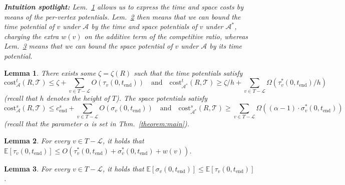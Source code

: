 \documentclass[11pt]{article}
\newtheorem{lemma}[theorem]{Lemma}
\theoremstyle{definition}
\theoremstyle{plain}
\newtheorem{lemma}[theorem]{Lemma}
\theoremstyle{definition}
\theoremstyle{plain}
\newtheorem{lemma}{Lemma}[section]
\theoremstyle{definition}
\theoremstyle{plain}
\newenvironment{IntuitionSpotlight}[0]
{\par%
\setlength{\leftskip}{0.5\parindent}%
\setlength{\rightskip}{0.5\parindent}%
\noindent\itshape\textbf{Intuition spotlight:}}
{\par\ignorespacesafterend}
\newcommand{\Thm}{Thm.}
\newcommand{\Lem}{Lem.}
\newcommand{\Expect}{\mathbb{E}}
\newcommand{\sCost}{\mathrm{cost}^{\mathit{s}}}
\newcommand{\tCost}{\mathrm{cost}^{\mathit{t}}}
\newcommand{\Leaves}{\mathcal{L}}
\newcommand{\EndTime}{\mathit{t}_{\mathrm{end}}}
\newcommand{\sEndCost}{\mathit{c}_{\mathrm{end}}^{\mathit{s}}}
\newcommand{\A}{\mathcal{A}}
\newcommand{\adv}[1]{{#1}^{*}}
\begin{document}
\begin{IntuitionSpotlight}
\Lem{}~\ref{lemma:expressing-costs-by-potentials} allows us to
express the time and space costs by means of the per-vertex potentials.
\Lem{}~\ref{lemma:bounding-time-potential} then means that we can
bound the time potential of $v$ under $\A$ by the time and space potentials of
$v$ under $\adv{\A}$, charging the extra $w(v)$ on the additive term of the
competitive ratio, whereas \Lem{}~\ref{lemma:bounding-space-potential} means
that we can bound the space potential of $v$ under $\A$ by its time
potential.
\end{IntuitionSpotlight}

\begin{lemma} \label{lemma:expressing-costs-by-potentials}
There exists some
$\zeta = \zeta(R)$
such that the time potentials satisfy
\[
\tCost_{\A}(R, \mathcal{T})
\leq
\zeta + \sum_{v \in T - \Leaves} O (\tau_{v}(0, \EndTime))
\quad \text{and} \quad
\tCost_{\adv{\A}}(R, \mathcal{T})
\geq
\zeta / h + \sum_{v \in T - \Leaves} \Omega (\adv{\tau}_{v}(0, \EndTime) / h)
\]
(recall that $h$ denotes the height of $T$).
The space potentials satisfy
\[
\sCost_{\A}(R, \mathcal{T})
\leq
\sEndCost + \sum_{v \in T - \Leaves} O (\sigma_{v}(0, \EndTime))
\quad \text{and} \quad
\sCost_{\adv{\A}}(R, \mathcal{T})
\geq
\sum_{v \in T - \Leaves} \Omega ((\alpha - 1) \cdot \adv{\sigma}_{v}(0, \EndTime))
\]
(recall that the parameter $\alpha$ is set in \Thm{}~\ref{theorem:main}).
\end{lemma}

\begin{lemma} \label{lemma:bounding-time-potential}
For every $v \in T - \Leaves$, it holds that
$\Expect[\tau_{v}(0, \EndTime)]
\leq
O (\adv{\tau}_{v}(0, \EndTime) + \adv{\sigma}_{v}(0, \EndTime) + w(v))$.
\end{lemma}

\begin{lemma} \label{lemma:bounding-space-potential}
For every $v \in T - \Leaves$, it holds that
$\Expect[\sigma_{v}(0, \EndTime)]
\leq
\Expect[\tau_{v}(0, \EndTime)]$.
\end{lemma}
\end{document}
